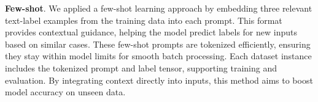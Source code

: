 \documentclass[runningheads]{llncs}
\begin{document}

\textbf{Few-shot}. We applied a few-shot learning approach by embedding three relevant text-label examples from the training data into each prompt. This format provides contextual guidance, helping the model predict labels for new inputs based on similar cases. These few-shot prompts are tokenized efficiently, ensuring they stay within model limits for smooth batch processing. Each dataset instance includes the tokenized prompt and label tensor, supporting training and evaluation. By integrating context directly into inputs, this method aims to boost model accuracy on unseen data.

\end{document}
